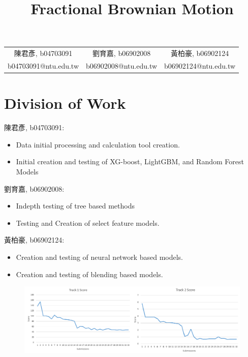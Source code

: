 \documentclass[a4paper, 12pt]{article}
\author{}
\title{\textbf{Fractional Brownian Motion}}
\begin{document}
    \maketitle     
    \begin{center}
        \begin{tabular}{ccc}
            陳君彥, b04703091 & 劉育嘉, b06902008 & 黃柏豪, b06902124 \\
            b04703091@ntu.edu.tw &
            b06902008@ntu.edu.tw &
            b06902124@ntu.edu.tw
        \end{tabular}
    \end{center}

    \section*{Division of Work}
        陳君彥, b04703091: 
        \begin{itemize}
            \item Data initial processing and calculation tool creation.
            \item Initial creation and testing of XG-boost, LightGBM, and Random Forest Models
        \end{itemize}
        劉育嘉, b06902008:
        \begin{itemize}
            \item Indepth testing of tree based methods
            \item Testing and Creation of select feature models.
        \end{itemize}
        黃柏豪, b06902124:
        \begin{itemize}
            \item Creation and testing of neural network based models.
            \item Creation and testing of blending based models.
        \end{itemize}

        \begin{figure}
            \includegraphics[width=\linewidth]{images/score.png}
            \label{score}
        \end{figure}
\end{document}
